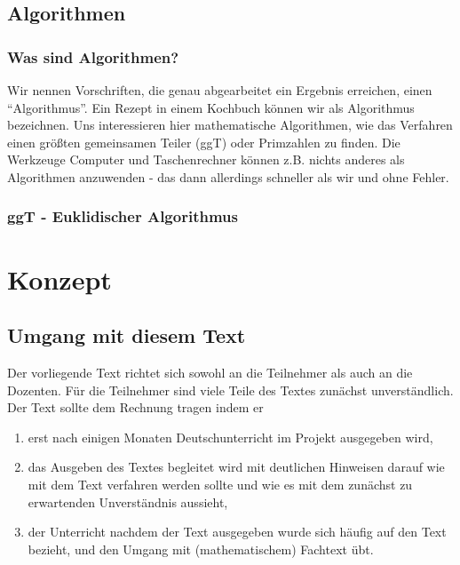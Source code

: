 \documentclass[a4paper]{book}%
\theoremstyle{definition}
\begin{document}
\chapter{Algorithmen}

\section{Was sind Algorithmen?}

Wir nennen Vorschriften, die genau abgearbeitet ein Ergebnis erreichen, einen \enquote{Algorithmus}. Ein Rezept in einem Kochbuch können wir als Algorithmus bezeichnen. Uns interessieren hier mathematische Algorithmen, wie das Verfahren einen größten gemeinsamen Teiler (ggT) oder Primzahlen zu finden. Die Werkzeuge Computer und Taschenrechner können z.B. nichts anderes als Algorithmen anzuwenden - das dann allerdings schneller als wir und ohne Fehler.

\section{ggT - Euklidischer Algorithmus}




\part{Konzept}\label{Konzept}


\chapter{Umgang mit diesem Text}

Der vorliegende Text richtet sich sowohl an die Teilnehmer als auch an die Dozenten. Für die Teilnehmer sind viele Teile des Textes zunächst unverständlich. Der Text sollte dem Rechnung tragen indem er
\begin{enumerate}
  \item erst nach einigen Monaten Deutschunterricht im Projekt ausgegeben wird,
  \item das Ausgeben des Textes begleitet wird mit deutlichen Hinweisen darauf wie mit dem Text verfahren werden sollte und wie es mit dem zunächst zu erwartenden Unverständnis aussieht,
  \item der Unterricht nachdem der Text ausgegeben wurde sich häufig auf den Text bezieht, und den Umgang mit (mathematischem) Fachtext übt.
\end{enumerate}
\end{document}
